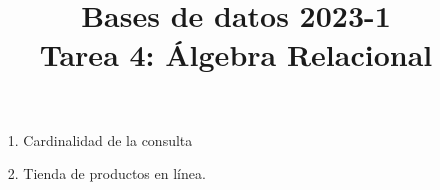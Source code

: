 \documentclass[12pt,a4paper]{article}
\title{Bases de datos 2023-1\\
Tarea 4: Álgebra Relacional}
\begin{document}
\maketitle

\begin{enumerate}
	\item[1.] Cardinalidad de la consulta
	\item[2.] Tienda de productos en línea.
\end{enumerate}
\end{document}
